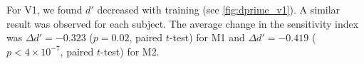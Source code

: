 

For \ac{V1}, we found $d'$ decreased with training (see \autoref{fig:dprime_v1}).
A similar result was observed for each subject.
The average change in the sensitivity index was $\Delta d' = -0.323$ ($p=0.02$, paired $t$-test) for \ac{M1} and $\Delta d' = -0.419$ ($p < 4 \times 10 ^{-7}$, paired $t$-test) for \ac{M2}.
 
